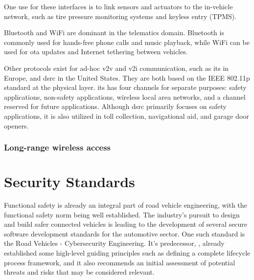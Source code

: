 One use for these interfaces is to link sensors and actuators to the in-vehicle network, such as tire pressure monitoring systems and keyless entry (TPMS).\par
Bluetooth and WiFi are dominant in the telematics domain. Bluetooth is commonly used for hands-free phone calls and music playback, while WiFi can be used for \gls{ota} updates and Internet tethering between vehicles.\par
Other protocols exist for ad-hoc \gls{v2v} and \gls{v2i} communication, such as \gls{its} in Europe, and \gls{dsrc} in the United States. They are both based on the IEEE 802.11p standard at the physical layer. \gls{its} has four channels for separate purposes: safety applications, non-safety applications, wireless local area networks, and a channel reserved for future applications. Although \gls{dsrc} primarily focuses on safety applications, it is also utilized in toll collection, navigational aid, and garage door openers.

\subsubsection{Long-range wireless access}

\section{Security Standards}

Functional safety is already an integral part of road vehicle engineering, with the functional safety norm \cite{ISO26262} being well established. The industry's pursuit to design and build safer connected vehicles is leading to the development of several secure software development standards for the automotive sector. One such standard is the \cite{ISO21434} Road Vehicles - Cybersecurity Engineering. It's predecessor, \cite{SAEJ3061}, already established some high-level guiding principles such as defining a complete lifecycle process framework, and it also recommends an initial assessment of potential threats and risks that may be considered relevant.\par

